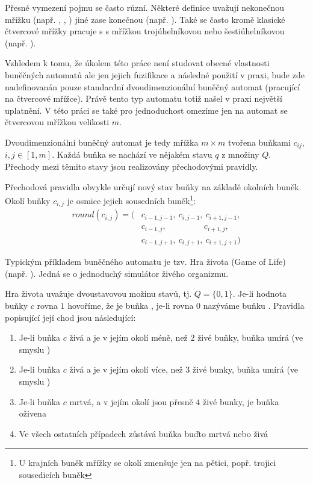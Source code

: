 \documentclass[a4paper,10pt]{article}
\begin{document}
Přesné vymezení pojmu  se často různí. Některé definice uvažují nekonečnou mřížku (např. \cite{Wol-NewKinSci}, \cite{Wol-CelAut}, \cite{BatXie-CellCity}) jiné zase konečnou (např. \cite{Wu-ExpGenPolUrbGroCelAutCit}). Také se často kromě klasické čtvercové mřížky pracuje s s mřížkou trojúhelníkovou nebo šestiúhelníkovou (např. \cite{For-FuzCelAutConjNormForm}).

Vzhledem k tomu, že úkolem této práce není studovat obecné vlastnosti buněčných automatů ale jen jejich fuzifikace a následné použití v praxi, bude zde nadefinovanán pouze standardní dvoudimenzionální buněčný automat (pracující na čtvercové mřížce). Právě tento typ automatu totiž našel v praxi největší uplatnění. V této práci se také pro jednoduchost omezíme jen na automat se čtvercovou mřížkou velikosti $m$.

Dvoudimenzionální buněčný automat je tedy mřížka $m \times m$ tvořena buňkami $c_{ij}$, $i, j \in [1,m]$. Každá buňka se nachází ve nějakém stavu $q$ z množiny $Q$. Přechody mezi těmito stavy jsou realizovány přechodovými pravidly. 

Přechodová pravidla obvykle určují nový stav buňky na základě okolních buněk. Okolí buňky $c_{i,j}$ je osmice jejich sousedních buněk\footnote{U krajních buněk mřížky se okolí zmenšuje jen na pětici, popř. trojici sousedicích buněk}:
\begin{align*}
 round(c_{i,j}) = (
  & c_{i-1, j-1},\ 	c_{i, j-1},\ 	c_{i+1, j-1},	\\
  & c_{i-1, j  },\ 	\qquad \qquad\ 	c_{i+1, j  },	\\
  & c_{i-1, j+1},\ 	c_{i, j+1},\ 	c_{i+1, j+1}	
 )
\end{align*}

\begin{example} \label{ex:GameOfLife}
  Typickým příkladem buněčného automatu je tzv. Hra života (Game of Life) (např. \cite{TofMar-CelAuMach+}). Jedná se o jednoduchý simulátor živého organizmu. 
  
  Hra života uvažuje dvoustavovou možinu stavů, tj. $Q = \{ 0, 1 \}$. Je-li hodnota buňky $c$ rovna $1$ hovoříme, že je buňka , je-li rovna $0$ nazýváme buňku . Pravidla popisující její chod jsou následující:
  \begin{enumerate}
   \item Je-li buňka $c$ živá a je v jejím okolí méně, než $2$ živé buňky, buňka umírá (ve smyslu )
   \item Je-li buňka $c$ živá a je v jejím okolí více, než $3$ živé bunky, buňka umírá (ve smyslu )
   \item Je-li buňka $c$ mrtvá, a v jejím okolí jsou přesně $4$ živé bunky, je buňka oživena
   \item Ve všech ostatních případech zůstává buňka buďto mrtvá nebo živá 
  \end{enumerate}
\end{example}
\end{document}
